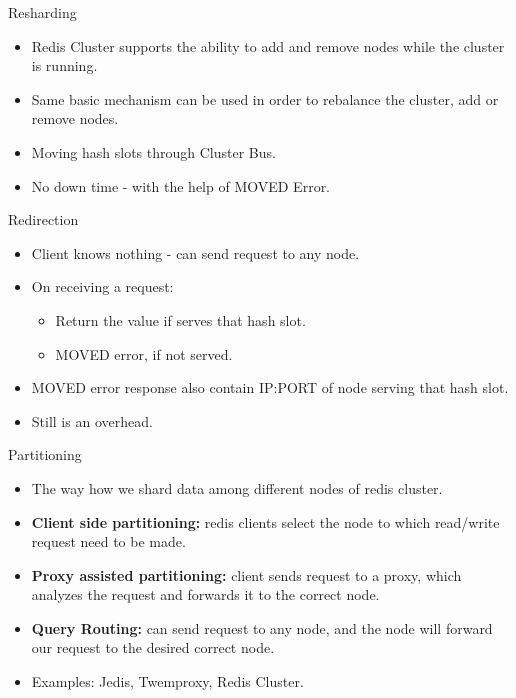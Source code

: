 \documentclass{beamer}
\begin{document}
\begin{frame}{Resharding}
\begin{itemize}
    \pause\item Redis Cluster supports the ability to add and remove nodes while the cluster is running.
    \pause\item Same basic mechanism can be used in order to rebalance the cluster, add or remove nodes.
    \pause\item Moving hash slots through Cluster Bus.
    \pause\item No down time - with the help of MOVED Error.
\end{itemize}
\end{frame}

\begin{frame}{Redirection}
\begin{itemize}
    \pause\item Client knows nothing - can send request to any node.
    \pause\item On receiving a request:
        \begin{itemize}
            \pause\item Return the value if serves that hash slot.
            \pause\item MOVED error, if not served.
        \end{itemize}
    \pause\item MOVED error response also contain IP:PORT of node serving that hash slot.
    \pause\item Still is an overhead.
\end{itemize}
\end{frame}


\begin{frame}{Partitioning}
\begin{itemize}
    \pause\item The way how we shard data among different nodes of redis cluster.
    \pause\item \textbf{Client side partitioning:} redis clients select the node to which read/write request need to be made.
    \pause\item \textbf{Proxy assisted partitioning:} client sends request to a proxy,
        which analyzes the request and forwards it to the correct node.
    \pause\item \textbf{Query Routing:} can send request to any node, and the node
        will forward our request to the desired correct node.
    \pause\item Examples: Jedis, Twemproxy, Redis Cluster. 
\end{itemize}
\end{frame}
\end{document}
